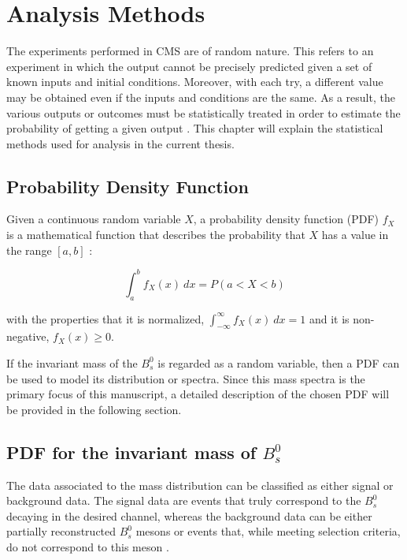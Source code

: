 \chapter[\leavevmode\newline Analysis Methods]{Analysis Methods}
\label{chap:Chapter_4}

The experiments performed in CMS are of random nature. This refers to an experiment in which the output cannot be precisely predicted given a set of known inputs and initial conditions. Moreover, with each try, a different value may be obtained even if the inputs and conditions are the same. As a result, the various outputs or outcomes must be statistically treated in order to estimate the probability of getting a given output \cite{vsirca2016probability}. This chapter will explain the statistical methods used for analysis in the current thesis.
\section{Probability Density Function}

Given a continuous random variable $X$, a probability density function (PDF) $f_X$ is a mathematical function that describes the probability that $X$ has a value in the range $[a, b]$ \cite{bragagnolo2021measurement, vsirca2016probability}:

\begin{equation}
	\int_{a}^{b} f_X(x) \ dx = P(a < X < b)
\end{equation}

with the properties that it is normalized, $\int_{-\infty}^{\infty} f_X(x) \ dx = 1$ and it is non-negative, $f_X(x) \geq 0$.

If the invariant mass of the $B^0_s$ is regarded as a random variable, then a PDF can be used to model its distribution or spectra. Since this mass spectra is the primary focus of this manuscript, a detailed description of the chosen PDF will be provided in the following section.
\section{PDF for the invariant mass of $B^0_s$}
The data associated to the mass distribution can be classified as either signal or background data. The signal data are events that truly correspond to the $B^0_s$ decaying in the desired channel, whereas the background data can be either partially reconstructed $B^0_s$ mesons or events that, while meeting selection criteria, do not correspond to this meson \cite{mejia2012medida}.

